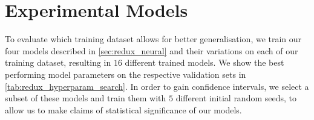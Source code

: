 \begin{table}[]
\centering
{}
\caption{In-domain scores on validation set by linear baselines.}
\label{tab:redux_linear_baselines_dev}
\end{table}

\section{Experimental Models}

To evaluate which training dataset allows for better generalisation, we train our four models described in \autoref{sec:redux_neural} and their variations on each of our training dataset, resulting in $16$ different trained models. We show the best performing model parameters on the respective validation sets in \autoref{tab:redux_hyperparam_search}. In order to gain confidence intervals, we select a subset of these models and train them with $5$ different initial random seeds, to allow us to make claims of statistical significance of our models.

